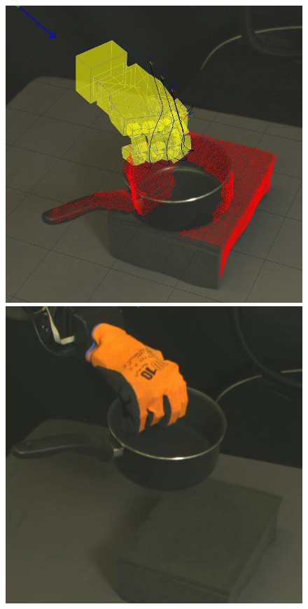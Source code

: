 \begin{figure}
\begin{center}
  \includegraphics[width=\tw]{images/experiments/query/saucepansmall-1-s}
 \includegraphics[width=\tw]{images/experiments/exec/saucepansmall-s}\\

\end{center}
\end{figure}
